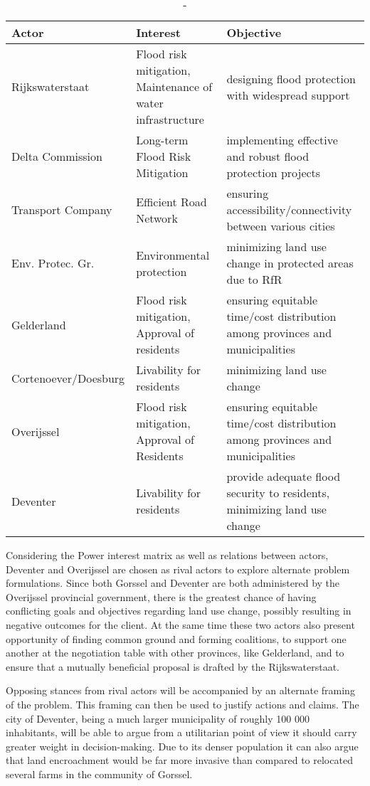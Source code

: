 \begin{table}[h!]
\begin{tabular}{lll}
\hline 
Actor & Interest & Objective \\ \hline
Rijkswaterstaat         & Flood risk mitigation, Maintenance of water infrastructure & designing flood protection with widespread support \\ 
Delta Commission        & Long-term Flood Risk Mitigation & implementing effective and robust flood protection projects \\
Transport Company       & Efficient Road Network & ensuring accessibility/connectivity between various cities \\
Env. Protec. Gr.        & Environmental protection & minimizing land use change in protected areas due to RfR \\
Gelderland              & Flood risk mitigation, Approval of residents & ensuring equitable time/cost distribution among provinces and municipalities \\
Cortenoever/Doesburg    & Livability for residents & minimizing land use change \\
Overijssel              & Flood risk mitigation, Approval of Residents & ensuring equitable time/cost distribution among provinces and municipalities \\
Deventer                & Livability for residents & provide adequate flood security to residents, minimizing land use change \\

\end{tabular}
\caption{-}
\label{t:actortable}
\end{table}
Considering the Power interest matrix as well as relations between actors, Deventer and Overijssel are chosen as rival actors to explore alternate problem formulations. Since both Gorssel and Deventer are both administered by the Overijssel provincial government, there is the greatest chance of having conflicting goals and objectives regarding land use change, possibly resulting in negative outcomes for the client. At the same time these two actors also present opportunity of finding common ground and forming coalitions, to support one another at the negotiation table with other provinces, like Gelderland, and to ensure that a mutually beneficial proposal is drafted by the Rijkswaterstaat.

Opposing stances from rival actors will be accompanied by an alternate framing of the problem. This framing can then be used to justify actions and claims. The city of Deventer, being a much larger municipality of roughly 100 000 inhabitants, will be able to argue from a utilitarian point of view it should carry greater weight in decision-making. Due to its denser population it can also argue that land encroachment would be far more invasive than compared to relocated several farms in the community of Gorssel. 

